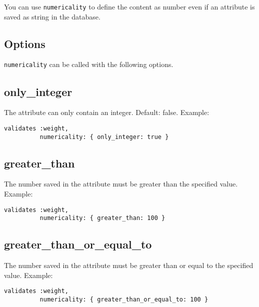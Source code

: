 \documentclass[a4paper]{book}
\newcounter{tab}[chapter]
\begin{document}
You can use \texttt{numericality} to define the content as number even if an attribute is saved as string in the database.

\subsection{Options}\label{options-4}

\texttt{numericality} can be called with the following options.

\subsection{only\_integer}\label{onlyux5finteger}

The attribute can only contain an integer. Default: false. Example:

\begin{shaded}\begin{verbatim}
validates :weight,
          numericality: { only_integer: true }
\end{verbatim}\end{shaded}

\subsection{greater\_than}\label{greaterux5fthan}

The number saved in the attribute must be greater than the specified value. Example:

\begin{shaded}\begin{verbatim}
validates :weight,
          numericality: { greater_than: 100 }
\end{verbatim}\end{shaded}

\subsection{greater\_than\_or\_equal\_to}\label{greaterux5fthanux5forux5fequalux5fto}

The number saved in the attribute must be greater than or equal to the specified value. Example:

\begin{shaded}\begin{verbatim}
validates :weight,
          numericality: { greater_than_or_equal_to: 100 }
\end{verbatim}\end{shaded}
\end{document}
